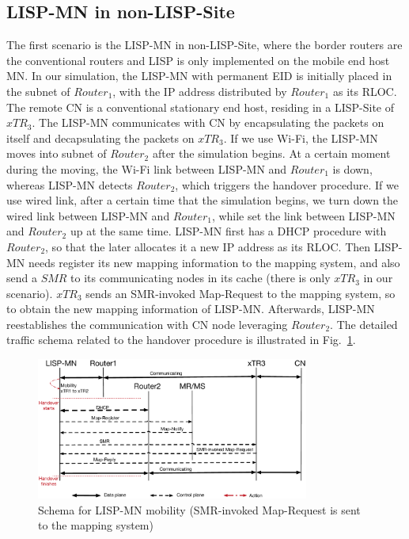 \subsection{LISP-MN in non-LISP-Site}
\label{sec:ns3_analysis_lispmn}
The first scenario is the LISP-MN in non-LISP-Site, where the border routers are the conventional routers and LISP is only implemented on the mobile end host MN. In our simulation, the LISP-MN with permanent EID is initially placed in the subnet of $Router_1$, with the IP address distributed by $Router_1$ as its RLOC. The remote CN is a conventional stationary end host, residing in a LISP-Site of $xTR_3$. The LISP-MN communicates with CN by encapsulating the packets on itself and decapsulating the packets on $xTR_3$. If we use Wi-Fi, the LISP-MN moves into subnet of $Router_2$ after the simulation begins. At a certain moment during the moving, the Wi-Fi link between LISP-MN and $Router_1$ is down, whereas LISP-MN detects $Router_2$, which triggers the handover procedure. If we use wired link, after a certain time that the simulation begins, we turn down the wired link between LISP-MN and $Router_1$, while set the link between LISP-MN and $Router_2$ up at the same time. LISP-MN first has a DHCP procedure with $Router_2$, so that the later allocates it a new IP address as its RLOC. Then LISP-MN needs register its new mapping information to the mapping system, and also send a $SMR$ to its communicating nodes in its cache (there is only $xTR_3$ in our scenario). $xTR_3$ sends an SMR-invoked Map-Request to the mapping system, so to obtain the new mapping information of LISP-MN. Afterwards, LISP-MN reestablishes the communication with CN node leveraging $Router_2$. The detailed traffic schema related to the handover procedure is illustrated in Fig.~\ref{sim_schema_LISPMN}.  %
\begin{figure}[!th]
	\centering
	\includegraphics[width=0.8\textwidth]{Pics/Mobility_LISPMN_schema_SMR_simplify}
	\caption{Schema for LISP-MN mobility (SMR-invoked Map-Request is sent to the mapping system)}
	\label{sim_schema_LISPMN}
\end{figure}

